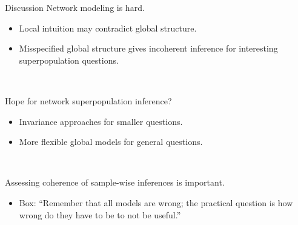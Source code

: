 \documentclass{beamer}
\begin{document}
\begin{frame}{Discussion}
    \alert{Network modeling is hard.}
\begin{itemize}
    \item Local intuition may contradict global structure.
    \item Misspecified global structure gives incoherent inference for interesting superpopulation questions.
\end{itemize}
~
\pause

    \alert{Hope for network superpopulation inference?}
\begin{itemize}
    \item Invariance approaches for smaller questions.
    \item More flexible global models for general questions.
\end{itemize}
~
\pause

    \alert{Assessing coherence of sample-wise inferences is important.}
\begin{itemize}
    \item Box: ``Remember that all models are wrong; the practical question is how wrong do they have to be to not be useful.''
\end{itemize}
\end{frame}
\end{document}
